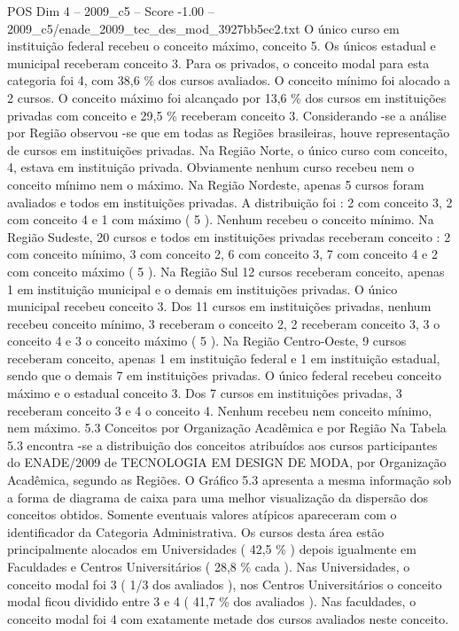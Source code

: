 \begin{textsample}{POS Dim 4 – 2009\_c5 – Score -1.00 – 2009\_c5/enade\_2009\_tec\_des\_mod\_3927bb5ec2.txt}
O único curso em instituição federal recebeu o conceito máximo, conceito 5.
Os únicos estadual e municipal receberam conceito 3.
Para os privados, o conceito modal para esta categoria foi 4, com 38,6 \% dos cursos avaliados.
O conceito mínimo foi alocado a 2 cursos.
O conceito máximo foi alcançado por 13,6 \% dos cursos em instituições privadas com conceito e 29,5 \% receberam conceito 3.
Considerando -se a análise por Região observou -se que em todas as Regiões brasileiras, houve representação de cursos em instituições privadas.
Na Região Norte, o único curso com conceito, 4, estava em instituição privada.
Obviamente nenhum curso recebeu nem o conceito mínimo nem o máximo.
Na Região Nordeste, apenas 5 cursos foram avaliados e todos em instituições privadas.
A distribuição foi : 2 com conceito 3, 2 com conceito 4 e 1 com máximo ( 5 ).
Nenhum recebeu o conceito mínimo.
Na Região Sudeste, 20 cursos e todos em instituições privadas receberam conceito : 2 com conceito mínimo, 3 com conceito 2, 6 com conceito 3, 7 com conceito 4 e 2 com conceito máximo ( 5 ).
Na Região Sul 12 cursos receberam conceito, apenas 1 em instituição municipal e o demais em instituições privadas.
O único municipal recebeu conceito 3.
Dos 11 cursos em instituições privadas, nenhum recebeu conceito mínimo, 3 receberam o conceito 2, 2 receberam conceito 3, 3 o conceito 4 e 3 o conceito máximo ( 5 ).
Na Região Centro-Oeste, 9 cursos receberam conceito, apenas 1 em instituição federal e 1 em instituição estadual, sendo que o demais 7 em instituições privadas.
O único federal recebeu conceito máximo e o estadual conceito 3.
Dos 7 cursos em instituições privadas, 3 receberam conceito 3 e 4 o conceito 4.
Nenhum recebeu nem conceito mínimo, nem máximo. 5.3 Conceitos por Organização Acadêmica e por Região Na Tabela 5.3 encontra -se a distribuição dos conceitos atribuídos aos cursos participantes do ENADE/2009 de TECNOLOGIA EM DESIGN DE MODA, por Organização Acadêmica, segundo as Regiões.
O Gráfico 5.3 apresenta a mesma informação sob a forma de diagrama de caixa para uma melhor visualização da dispersão dos conceitos obtidos.
Somente eventuais valores atípicos apareceram com o identificador da Categoria Administrativa.
Os cursos desta área estão principalmente alocados em Universidades ( 42,5 \% ) depois igualmente em Faculdades e Centros Universitários ( 28,8 \% cada ).
Nas Universidades, o conceito modal foi 3 ( 1/3 dos avaliados ), nos Centros Universitários o conceito modal ficou dividido entre 3 e 4 ( 41,7 \% dos avaliados ).
Nas faculdades, o conceito modal foi 4 com exatamente metade dos cursos avaliados neste conceito.

\end{textsample}
